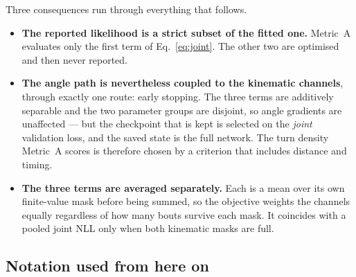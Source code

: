 \documentclass[11pt,a4paper]{article}
\begin{document}
Three consequences run through everything that follows.

\begin{itemize}\itemsep3pt
\item \textbf{The reported likelihood is a strict subset of the fitted one.} Metric~A
      evaluates only the first term of Eq.~\eqref{eq:joint}. The other two are optimised
      and then never reported.
\item \textbf{The angle path is nevertheless coupled to the kinematic channels}, through
      exactly one route: early stopping. The three terms are additively separable and the
      two parameter groups are disjoint, so angle gradients are unaffected --- but the
      checkpoint that is kept is selected on the \emph{joint} validation loss, and the
      saved state is the full network. The turn density Metric~A scores is therefore chosen
      by a criterion that includes distance and timing.
\item \textbf{The three terms are averaged separately.} Each is a mean over its own
      finite-value mask before being summed, so the objective weights the channels equally
      regardless of how many bouts survive each mask. It coincides with a pooled joint NLL
      only when both kinematic masks are full.
\end{itemize}

\subsection{Notation used from here on}\label{sec:notation}
\end{document}
